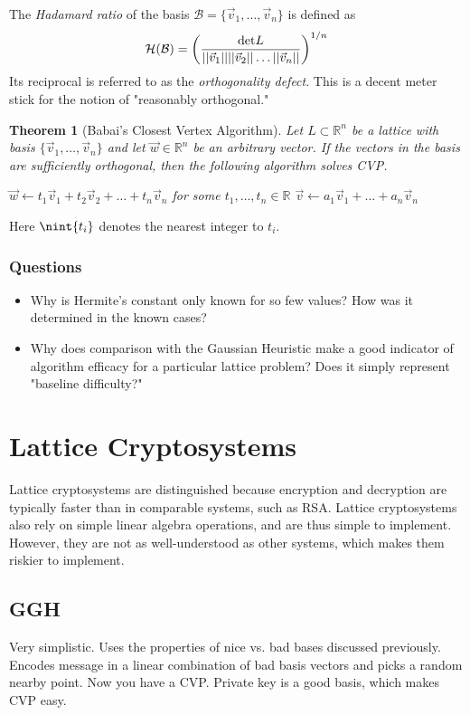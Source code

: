 \documentclass[10pt,a4paper]{article}
\newtheorem*{theorem}{Theorem}
\theoremstyle{remark}
\DeclarePairedDelimiter{\nint}\lfloor\rceil
\begin{document}
The \textit{Hadamard ratio} of the basis $\mathcal{B}=\{\vec{v}_1, \ldots, \vec{v}_n\}$ is defined as
$$\mathcal{H}(\mathcal{B})=\left(\frac{\textup{det}L}{\vert \vert \vec{v}_1\vert\vert\vert \vert \vec{v}_2\vert\vert\ldots\vert \vert \vec{v}_n\vert\vert} \right)^{1/n}$$
Its reciprocal is referred to as the \textit{orthogonality defect}. This is a decent meter stick for the notion of "reasonably orthogonal."

\begin{theorem}[Babai's Closest Vertex Algorithm]
Let $L\subset \mathbb{R}^n$ be a lattice with basis $\{\vec{v}_1, \ldots, \vec{v}_n\}$ and let $\vec{w}\in\mathbb{R}^n$ be an arbitrary vector. If the vectors in the basis are sufficiently orthogonal, then the following algorithm solves CVP.
\begin{algorithm}[H]
$\vec{w}\leftarrow t_1\vec{v}_1+t_2\vec{v}_2+\ldots+t_n\vec{v}_n$ for some $t_1,\ldots,t_n\in\mathbb{R}$\;
\Return $\vec{v}\leftarrow a_1\vec{v}_1+\ldots+a_n\vec{v}_n$
\caption{Babai's Algorithm}
\end{algorithm}
\end{theorem} 
Here $\nint{t_i}$ denotes the nearest integer to $t_i$.

\subsubsection{Questions}
\begin{itemize}
\item Why is Hermite's constant only known for so few values? How was it determined in the known cases?
\item Why does comparison with the Gaussian Heuristic make a good indicator of algorithm efficacy for a particular lattice problem? Does it simply represent "baseline difficulty?"
\end{itemize}

\section{Lattice Cryptosystems}
Lattice cryptosystems are distinguished because encryption and decryption are typically faster than in comparable systems, such as RSA. Lattice cryptosystems also rely on simple linear algebra operations, and are thus simple to implement. However, they are not as well-understood as other systems, which makes them riskier to implement.

\subsection{GGH}
Very simplistic. Uses the properties of nice vs. bad bases discussed previously. Encodes message in a linear combination of bad basis vectors and picks a random nearby point. Now you have a CVP. Private key is a good basis, which makes CVP easy.
\end{document}
